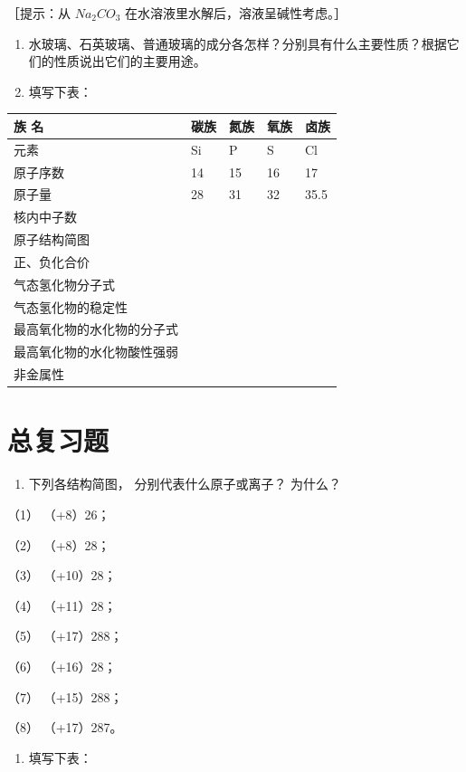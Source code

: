 ［提示：从 \(Na_{2}CO_{3}\) 在水溶液里水解后，溶液呈碱性考虑。］

\begin{enumerate}[start=5]
\item
  水玻璃、石英玻璃、普通玻璃的成分各怎样？分别具有什么主要性质？根据它们的性质说出它们的主要用途。
\item
  填写下表：
\end{enumerate}

{\def\LTcaptype{none} %
\begin{longtable}[]{@{}lllll@{}}
\toprule\noalign{}
族 名 & 碳族 & 氮族 & 氧族 & 卤族 \\
\midrule\noalign{}
\endhead
\bottomrule\noalign{}
\endlastfoot
元素 & Si & P & S & Cl \\
原子序数 & 14 & 15 & 16 & 17 \\
原子量 & 28 & 31 & 32 & 35.5 \\
核内中子数 & & & & \\
原子结构简图 & & & & \\
正、负化合价 & & & & \\
气态氢化物分子式 & & & & \\
气态氢化物的稳定性 & & & & \\
最高氧化物的水化物的分子式 & & & & \\
最高氧化物的水化物酸性强弱 & & & & \\
非金属性 & & & & \\
\end{longtable}
}

\chapter{总复习题}

\begin{enumerate}
\item
  下列各结构简图， 分别代表什么原子或离子？ 为什么？
\end{enumerate}

（1） （+8）26；

（2） （+8）28；

（3） （+10）28；

（4） （+11）28；

（5） （+17）288；

（6） （+16）28；

（7） （+15）288；

（8） （+17）287。

\begin{enumerate}[start=2]
\item
  填写下表：
\end{enumerate}

